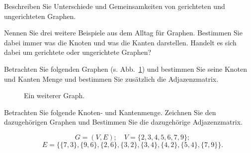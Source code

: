 \begin{kontr}
Beschreiben Sie Unterschiede und Gemeinsamkeiten von gerichteten und ungerichteten Graphen.
\end{kontr}


\begin{kontr}
Nennen Sie drei weitere Beispiele aus dem Alltag für Graphen. 
Bestimmen Sie dabei immer was die Knoten und was die Kanten darstellen. 
Handelt es sich dabei um gerichtete oder ungerichtete Graphen?
\end{kontr}


\begin{kontr}
Betrachten Sie folgenden Graphen (s. Abb.~\ref{fig:kont:graph}) und bestimmen Sie seine Knoten und Kanten Menge und bestimmen Sie zusätzlich die Adjazenzmatrix.

\begin{figure}[htb]
\begin{center}
\caption{Ein weiterer Graph.}
\label{fig:kont:graph}
\end{center}
\end{figure}

\end{kontr}

\begin{kontr}
Betrachten Sie folgende Knoten- und Kantenmenge. Zeichnen Sie den dazugehörigen Graphen und Bestimmen Sie die dazugehörige Adjazenzmatrix.

\[ \quad G = (V, E); \quad V = \{2,3,4,5,6,7,9\}; \] 
\[\quad E =  \{ \{7,3\},\{9,6\}, \{2,6\}, \{3,2\}, \{3,4\}, \{4,2\}, \{5,4\}, \{7,9\}\}. \]

\end{kontr}

